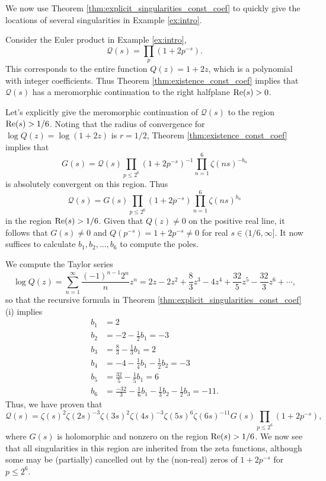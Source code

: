 \documentclass[12pt]{amsart}
\newenvironment{BOXexample}{
\begin{exbox}\mbox{}
\begin{example}
}
{
\end{example}
\end{exbox}
}
\theoremstyle{plain}
\begin{document}
We now use Theorem \ref{thm:explicit_singularities_const_coef} to quickly give the locations of several singularities in Example \ref{ex:intro}.

\begin{BOXexample}\label{ex:intro_more_poles}
    Consider the Euler product in Example \ref{ex:intro},
    \[
    \mathcal{Q}(s) = \prod_{p}(1 + 2p^{-s}).
    \]
    This corresponds to the entire function $Q(z) = 1 + 2z$, which is a polynomial with integer coefficients. Thus Theorem \ref{thm:existence_const_coef} implies that $\mathcal{Q}(s)$ has a meromorphic continuation to the right halfplane ${\rm Re}(s) > 0$.

    Let's explicitly give the meromorphic continuation of $\mathcal{Q}(s)$ to the region ${\rm Re}(s) > 1/6$. Noting that the radius of convergence for $\log Q(z)=\log(1+2z)$ is $r=1/2$, Theorem \ref{thm:existence_const_coef} implies that
    \[
    G(s) = \mathcal{Q}(s) \prod_{p\le 2^6} (1+2p^{-s})^{-1}\prod_{n=1}^6 \zeta(ns)^{-b_n}
    \]
    is absolutely convergent on this region. Thus
    \[
    \mathcal{Q}(s) = G(s)\prod_{p\le 2^6} (1+2p^{-s})\prod_{n=1}^6 \zeta(ns)^{b_n}
    \]
    in the region ${\rm Re}(s) > 1/6$. Given that $Q(z)\ne 0$ on the positive real line, it follows that $G(s)\ne 0$ and $Q(p^{-s})=1+2p^{-s}\ne 0$ for real $s\in (1/6,\infty]$. It now suffices to calculate $b_1,b_2,...,b_6$ to compute the poles.

    We compute the Taylor series
    \[
    \log Q(z) = \sum_{n=1}^\infty \frac{(-1)^{n-1}2^n}{n}z^n = 2z - 2z^2 + \frac{8}{3}z^3 - 4z^4 + \frac{32}{5}z^5 - \frac{32}{3}z^6 + \cdots,
    \]
    so that the recursive formula in Theorem \ref{thm:explicit_singularities_const_coef}(i) implies
    \begin{align*}
        b_1 &= 2\\
        b_2 &= -2 - \frac{1}{2}b_1 = -3\\
        b_3 &= \frac{8}{3} - \frac{1}{3}b_1 = 2\\
        b_4 &= -4 - \frac{1}{4}b_1 - \frac{1}{2}b_2 = -3\\
        b_5 &= \frac{32}{5} - \frac{1}{5}b_1 = 6\\
        b_6 &= \frac{-32}{3} - \frac{1}{6}b_1 - \frac{1}{3}b_2 - \frac{1}{2}b_3 = -11.
    \end{align*}
    Thus, we have proven that
    \[
    \mathcal{Q}(s) = \zeta(s)^2 \zeta(2s)^{-3}\zeta(3s)^{2}\zeta(4s)^{-3}\zeta(5s)^6\zeta(6s)^{-11} G(s)\prod_{p\le 2^6} (1+2p^{-s}),
    \]
    where $G(s)$ is holomorphic and nonzero on the region ${\rm Re}(s) > 1/6$. We now see that all singularities in this region are inherited from the zeta functions, although some may be (partially) cancelled out by the (non-real) zeros of $1+2p^{-s}$ for $p\le 2^6$.
\end{BOXexample}
\end{document}
